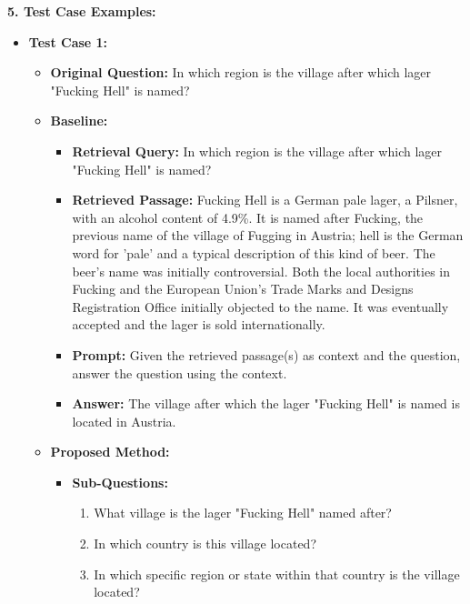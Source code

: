\begin{tcolorbox}[colback=blue!5!white,colframe=blue!75!black,title=\textbf{LLM Directed Retrieval Querying for Improving Factuality (Part 2)}]
\small 
    \textbf{5. Test Case Examples:}
    \begin{itemize}
        \item \textbf{Test Case 1:}
        \begin{itemize}
            \item \textbf{Original Question:} In which region is the village after which lager "Fucking Hell" is named?
            \item \textbf{Baseline:}
            \begin{itemize}
                \item \textbf{Retrieval Query:} In which region is the village after which lager "Fucking Hell" is named?
                \item \textbf{Retrieved Passage:} Fucking Hell is a German pale lager, a Pilsner, with an alcohol content of 4.9\%. It is named after Fucking, the previous name of the village of Fugging in Austria; hell is the German word for 'pale' and a typical description of this kind of beer. The beer's name was initially controversial. Both the local authorities in Fucking and the European Union's Trade Marks and Designs Registration Office initially objected to the name. It was eventually accepted and the lager is sold internationally.
                \item \textbf{Prompt:} Given the retrieved passage(s) as context and the question, answer the question using the context.
                \item \textbf{Answer:} The village after which the lager "Fucking Hell" is named is located in Austria.
            \end{itemize}
            \item \textbf{Proposed Method:}
            \begin{itemize}
                \item \textbf{Sub-Questions:}
                \begin{enumerate}
                    \item What village is the lager "Fucking Hell" named after?
                    \item In which country is this village located?
                    \item In which specific region or state within that country is the village located?
                \end{enumerate}

\end{itemize}
\end{itemize}
\end{itemize}
\end{tcolorbox}
